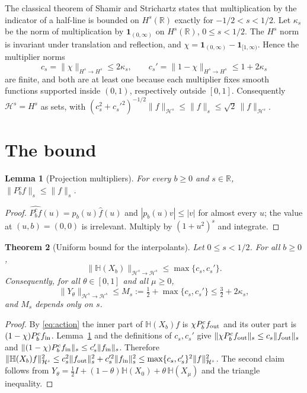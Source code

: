 \documentclass[11pt,a4paper]{article}
\newtheorem{theorem}{Theorem}\newtheorem{corollary}[theorem]{Corollary}\newtheorem{proposition}[theorem]{Proposition}\newtheorem{lemma}[theorem]{Lemma}
\theoremstyle{definition}\newtheorem{definition}[theorem]{Definition}
\begin{document}
The classical theorem of Shamir and Strichartz \cite{strichartz,meyries} states that multiplication by the indicator of a half-line is bounded on $H^s(\mathbb R)$ exactly for $-1/2<s<1/2$. Let $\kappa_s$ be the norm of multiplication by $\mathbf 1_{(0,\infty)}$ on $H^s(\mathbb R)$, $0\le s<1/2$. The $H^s$ norm is invariant under translation and reflection, and $\chi=\mathbf 1_{(0,\infty)}-\mathbf 1_{[1,\infty)}$. Hence the multiplier norms
\[
c_s=\|\chi\|_{H^s\to H^s}\le 2\kappa_s,\qquad c_s'=\|1-\chi\|_{H^s\to H^s}\le 1+2\kappa_s
\]
are finite, and both are at least one because each multiplier fixes smooth functions supported inside $(0,1)$, respectively outside $[0,1]$. Consequently $\mathcal H^s=H^s$ as sets, with
$(c_s^2+c_s'^2)^{-1/2}\|f\|_{\mathcal H^s}\le\|f\|_s\le\sqrt2\,\|f\|_{\mathcal H^s}$.

\section{The bound}
\begin{lemma}[Projection multipliers]\label{lem:proj}
For every $b\ge0$ and $s\in\mathbb R$, $\|P_b^c f\|_s\le\|f\|_s$.
\end{lemma}
\begin{proof}
$\widehat{P_b^cf}(u)=p_b(u)\hat f(u)$ and $|p_b(u)v|\le|v|$ for almost every $u$; the value at $(u,b)=(0,0)$ is irrelevant. Multiply by $(1+u^2)^s$ and integrate.
\end{proof}

\begin{theorem}[Uniform bound for the interpolants]\label{thm:Ms}
Let $0\le s<1/2$. For all $b\ge0$,
\[
\|\mathbb H(X_b)\|_{\mathcal H^s\to\mathcal H^s}\le\max\{c_s,c_s'\}.
\]
Consequently, for all $\theta\in[0,1]$ and all $\mu\ge0$,
\[
\|Y_\theta\|_{\mathcal H^s\to\mathcal H^s}\le M_s:=\tfrac12+\max\{c_s,c_s'\}\le\tfrac32+2\kappa_s ,
\]
and $M_s$ depends only on $s$.
\end{theorem}
\begin{proof}
By \eqref{eq:action} the inner part of $\mathbb H(X_b)f$ is $\chi P_b^cf_{\rm out}$ and its outer part is $(1-\chi)P_b^cf_{\rm in}$. Lemma~\ref{lem:proj} and the definitions of $c_s,c_s'$ give
$\|\chi P_b^cf_{\rm out}\|_s\le c_s\|f_{\rm out}\|_s$ and $\|(1-\chi)P_b^cf_{\rm in}\|_s\le c_s'\|f_{\rm in}\|_s$. Therefore
$\|\mathbb H(X_b)f\|_{\mathcal H^s}^2\le c_s^2\|f_{\rm out}\|_s^2+c_s'^2\|f_{\rm in}\|_s^2\le\max\{c_s,c_s'\}^2\|f\|_{\mathcal H^s}^2$.
The second claim follows from $Y_\theta=\tfrac12I+(1-\theta)\mathbb H(X_0)+\theta\,\mathbb H(X_\mu)$ and the triangle inequality.
\end{proof}
\end{document}
